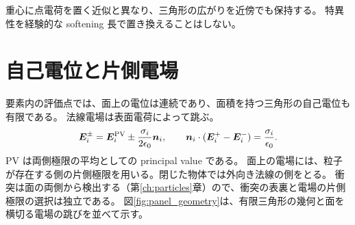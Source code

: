 重心に点電荷を置く近似と異なり、三角形の広がりを近傍でも保持する。
特異性を経験的な softening 長で置き換えることはしない。

\section{自己電位と片側電場}
要素内の評価点では、面上の電位は連続であり、面積を持つ三角形の自己電位も有限である。
法線電場は表面電荷によって跳ぶ。
\begin{equation}
 \bm{E}_i^{\pm}
 =\bm{E}_i^{\mathrm{PV}}\pm\frac{\sigma_i}{2\epsilon_0}\bm{n}_i,
 \qquad
 \bm{n}_i\cdot(\bm{E}_i^+-\bm{E}_i^-)=\frac{\sigma_i}{\epsilon_0}.
 \label{eq:jump}
\end{equation}
$\mathrm{PV}$ は両側極限の平均としての principal value である。
面上の電場には、粒子が存在する側の片側極限を用いる。閉じた物体では外向き法線の側をとる。
衝突は面の両側から検出する（第\ref{ch:particles}章）ので、衝突の表裏と電場の片側極限の選択は独立である。
図\ref{fig:panel_geometry}は、有限三角形の幾何と面を横切る電場の跳びを並べて示す。

